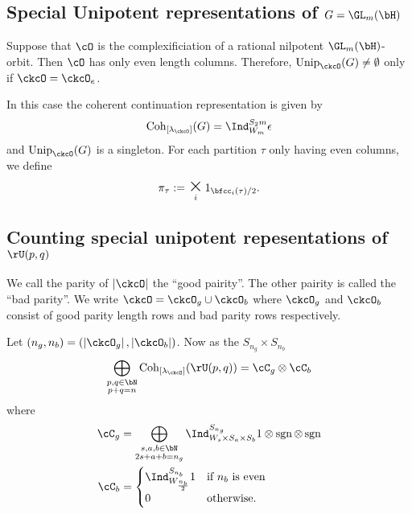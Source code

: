\documentclass[counting_main.tex]{subfiles}
\begin{document}
\subsection{Special Unipotent representations of $G=\GL_{m}(\bH)$}

Suppose that $\cO$ is the complexificiation of a rational nilpotent $\GL_{m}(\bH)$-orbit.
Then $\cO$ has only even length columns.
Therefore, $\Unip_\ckcO(G) \neq\emptyset$ only if $\ckcO = \ckcO_e$.

In this case the coherent continuation representation is given by
\[
  \Cint{\lamck}(G) = \Ind_{W_m}^{S_2m}\epsilon
\]
and $\Unip_\ckcO(G)$ is a singleton. %
For each partition $\tau$ only having even columns, we define
\[
  \pi_{\tau} := \bigtimes_i 1_{\bfcc_i(\tau)/2}.
\]

\subsection{Counting special unipotent repesentations of $\rU(p,q)$}
We call the parity of $\abs{\ckcO}$ the ``good pairity''.  The other pairity is called the ``bad parity''.
We write $\ckcO = \ckcO_g\cup \ckcO_b$ where $\ckcO_g$ and $\ckcO_b$ consist of good parity length rows
and bad parity rows respectively.

Let $(n_g,n_b) = (\abs{\ckcO_g},\abs{\ckcO_b})$.
Now as the $S_{n_g}\times S_{n_b}$
\[
\bigoplus_{\substack{p,q\in \bN\\p+q=n}} \Cint{\lamck}(\rU(p,q)) = \cC_{g}\otimes \cC_{b}
\]
where
\[
  \begin{split}
 \cC_{g} &= \bigoplus_{\substack{s,a,b\in \bN\\2s+a+b=n_g}} \Ind_{W_{s}\times S_a\times S_b}^{S_{n_g}}
 1\otimes \sgn\otimes \sgn \\
 \cC_{b} &= \begin{cases}
  \Ind_{W_{\frac{n_b}{2}}}^{S_{n_b}} 1 & \text{if $n_b$ is even}\\
  0 & \text{otherwise}.
 \end{cases}
  \end{split}
\]
\end{document}
